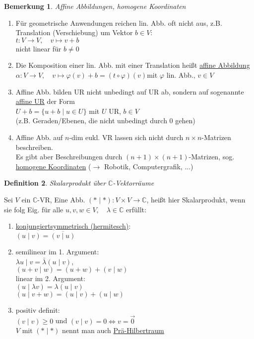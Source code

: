 \documentclass[a4paper,11pt]{article}
\newtheorem{definition}{Definition}[section]
\newtheorem{bem}[definition]{Bemerkung}
\newcommand{\zerovec}{\overset{\rightarrow}{0}}
\newcommand{\hsp}{\hspace{5mm}}
\begin{document}
\begin{bem}
	Affine Abbildungen, homogene Koordinaten
\end{bem}
\begin{enumerate}[label=\alph*)]
	\item Für geometrische Anwendungen reichen lin. Abb. oft nicht aus, z.B. Translation (Verschiebung) um Vektor $b\in V\colon$ \\
	$t\colon V\to V,\quad v\mapsto v+b$ \\
	nicht linear für $b\neq0$
	\item Die Komposition einer lin. Abb. mit einer Translation heißt \underline{affine Abbildung} \\
	$\alpha\colon V\to V,\quad v\mapsto\varphi(v)+b=(t\circ\varphi)(v)$\hsp mit $\varphi$ lin. Abb., $v\in V$
	\item Affine Abb. bilden UR nicht unbedingt auf UR ab, sondern auf sogenannte \underline{affine UR} der Form \\
	$U+b=\{u+b\mid u\in U\}$ mit $U$ UR, $b\in V$ \\
	(z.B. Geraden/Ebenen, die nicht unbedingt durch 0 gehen)
	\item Affine Abb. auf $n$-dim eukl. VR lassen sich nicht durch $n\times n$-Matrizen beschreiben. \\
	Es gibt aber Beschreibungen durch $(n+1)\times(n+1)$-Matrizen, sog. \underline{homogene Koordinaten} ($\rightarrow$ Robotik, Computergrafik, ...)
\end{enumerate}

\begin{definition}
	Skalarprodukt über $\mathbb{C}$-Vektorräume
\end{definition}
Sei $V$ ein $\mathbb{C}$-VR, Eine Abb. $(*\mid*)\colon V\times V\to\mathbb{C}$, heißt hier Skalarprodukt, wenn sie folg Eig. für alle $u,v,w\in V,\quad\lambda\in\mathbb{C}$ erfüllt:
\begin{enumerate}[label=(\arabic*)]
	\item \underline{konjungiertsymmetrisch (hermitesch)}: \\
	$(u\mid v)=\overline{(v\mid u)}$
	\item semilinear im 1. Argument:\\
	$\lambda u\mid v=\bar\lambda(u\mid v)$, \\
	$(u+v\mid w)=(u+w)+(v\mid w)$ \\
	linear im 2. Argument: \\
	$(u\mid\lambda v)=\lambda(u\mid v)$ \\
	$(u\mid v+w)=(u\mid v)+(u\mid w)$
	\item positiv definit: \\
	$(v\mid v)\geq 0$ und $(v\mid v)=0\Leftrightarrow v=\zerovec$  \\
	$V$ mit $(*\mid*)$ nennt man auch \underline{Prä-Hilbertraum} %
\end{enumerate}
\end{document}
